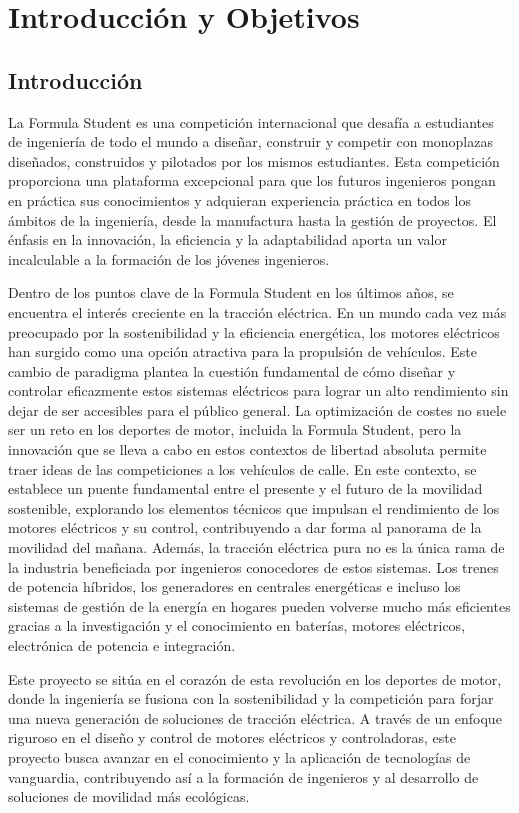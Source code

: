 \chapter{Introducción y Objetivos}

\section{Introducción}
La Formula Student es una competición internacional que desafía a estudiantes de ingeniería de todo el mundo a diseñar, construir y competir con monoplazas diseñados, construidos y pilotados por los mismos estudiantes. Esta competición proporciona una plataforma excepcional para que los futuros ingenieros pongan en práctica sus conocimientos y adquieran experiencia práctica en todos los ámbitos de la ingeniería, desde la manufactura hasta la gestión de proyectos. El énfasis en la innovación, la eficiencia y la adaptabilidad aporta un valor incalculable a la formación de los jóvenes ingenieros.

Dentro de los puntos clave de la Formula Student en los últimos años, se encuentra el interés creciente en la tracción eléctrica. En un mundo cada vez más preocupado por la sostenibilidad y la eficiencia energética, los motores eléctricos han surgido como una opción atractiva para la propulsión de vehículos. Este cambio de paradigma plantea la cuestión fundamental de cómo diseñar y controlar eficazmente estos sistemas eléctricos para lograr un alto rendimiento sin dejar de ser accesibles para el público general. La optimización de costes no suele ser un reto en los deportes de motor, incluida la Formula Student, pero la innovación que se lleva a cabo en estos contextos de libertad absoluta permite traer ideas de las competiciones a los vehículos de calle. En este contexto, se establece un puente fundamental entre el presente y el futuro de la movilidad sostenible, explorando los elementos técnicos que impulsan el rendimiento de los motores eléctricos y su control, contribuyendo a dar forma al panorama de la movilidad del mañana. Además, la tracción eléctrica pura no es la única rama de la industria beneficiada por ingenieros conocedores de estos sistemas. Los trenes de potencia híbridos, los generadores en centrales energéticas e incluso los sistemas de gestión de la energía en hogares pueden volverse mucho más eficientes gracias a la investigación y el conocimiento en baterías, motores eléctricos, electrónica de potencia e integración.

Este proyecto se sitúa en el corazón de esta revolución en los deportes de motor, donde la ingeniería se fusiona con la sostenibilidad y la competición para forjar una nueva generación de soluciones de tracción eléctrica. A través de un enfoque riguroso en el diseño y control de motores eléctricos y controladoras, este proyecto busca avanzar en el conocimiento y la aplicación de tecnologías de vanguardia, contribuyendo así a la formación de ingenieros y al desarrollo de soluciones de movilidad más ecológicas.


